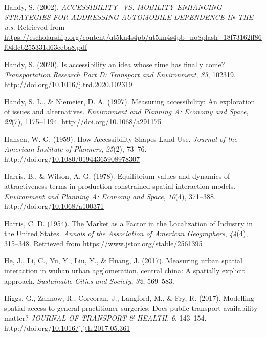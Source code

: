 \documentclass[
11pt, %
oneside, %
english, %
singlespacing, %
]{macthesis} %
\newlength{\cslhangindent}
\newenvironment{CSLReferences}[2] %
{\begin{list}{}{%
	\setlength{\itemindent}{0pt}
	\setlength{\leftmargin}{0pt}
	\setlength{\parsep}{0pt}
	\ifodd #1
	\setlength{\leftmargin}{\cslhangindent}
	\setlength{\itemindent}{-1\cslhangindent}
	\fi
	\setlength{\itemsep}{#2\baselineskip}}}
{\end{list}}
\begin{document}
\begin{CSLReferences}{1}{0}
Handy, S. (2002). \emph{{ACCESSIBILITY}- {VS}. {MOBILITY}-{ENHANCING} {STRATEGIES} {FOR} {ADDRESSING} {AUTOMOBILE} {DEPENDENCE} {IN} {THE} u.s.} Retrieved from \url{https://escholarship.org/content/qt5kn4s4pb/qt5kn4s4pb_noSplash_18f73162ff86f04dcb255331d63eeba8.pdf}

Handy, S. (2020). Is accessibility an idea whose time has finally come? \emph{Transportation Research Part D: Transport and Environment}, \emph{83}, 102319. http://doi.org/\href{https://doi.org/10.1016/j.trd.2020.102319}{10.1016/j.trd.2020.102319}

Handy, S. L., \& Niemeier, D. A. (1997). Measuring accessibility: An exploration of issues and alternatives. \emph{Environment and Planning A: Economy and Space}, \emph{29}(7), 1175--1194. http://doi.org/\href{https://doi.org/10.1068/a291175}{10.1068/a291175}

Hansen, W. G. (1959). How Accessibility Shapes Land Use. \emph{Journal of the American Institute of Planners}, \emph{25}(2), 73--76. http://doi.org/\href{https://doi.org/10.1080/01944365908978307}{10.1080/01944365908978307}

Harris, B., \& Wilson, A. G. (1978). Equilibrium values and dynamics of attractiveness terms in production-constrained spatial-interaction models. \emph{Environment and Planning A: Economy and Space}, \emph{10}(4), 371--388. http://doi.org/\href{https://doi.org/10.1068/a100371}{10.1068/a100371}

Harris, C. D. (1954). The {Market} as a {Factor} in the {Localization} of {Industry} in the {United} {States}. \emph{Annals of the Association of American Geographers}, \emph{44}(4), 315--348. Retrieved from \url{https://www.jstor.org/stable/2561395}

He, J., Li, C., Yu, Y., Liu, Y., \& Huang, J. (2017). Measuring urban spatial interaction in wuhan urban agglomeration, central china: A spatially explicit approach. \emph{Sustainable Cities and Society}, \emph{32}, 569--583.

Higgs, G., Zahnow, R., Corcoran, J., Langford, M., \& Fry, R. (2017). Modelling spatial access to general practitioner surgeries: Does public transport availability matter? \emph{{JOURNAL} {OF} {TRANSPORT} \& {HEALTH}}, \emph{6}, 143--154. http://doi.org/\href{https://doi.org/10.1016/j.jth.2017.05.361}{10.1016/j.jth.2017.05.361}


\end{CSLReferences}
\end{document}
